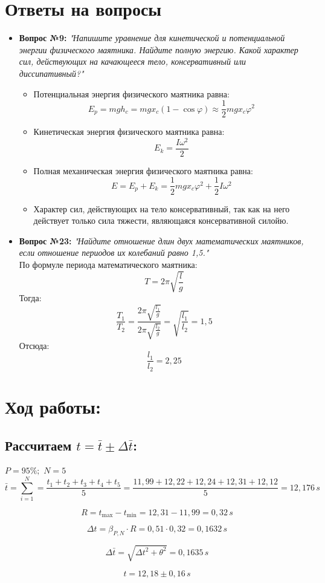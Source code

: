\documentclass[a4paper,12pt]{report}
\begin{document}
\newpage
\section*{Ответы на вопросы}

\begin{itemize}
    \item \textbf{Вопрос №9:}
    	\textit{"Напишите уравнение для кинетической и потенциальной энергии физического маятника. Найдите полную энергию. Какой характер сил, действующих на качающееся тело, консервативный или диссипативный?"}
        \begin{itemize}
            \item Потенциальная энергия физического маятника равна:
            \[ E_p = mgh_c = mgx_c(1-\cos\varphi) \approx \frac{1}{2}mgx_c\varphi^2 \]
            \item Кинетическая энергия физического маятника равна:
            \[ E_k = \frac{I\omega^2}{2} \]
            \item Полная механическая энергия физического маятника равна:
            \[ E = E_p + E_k = \frac{1}{2}mgx_c\varphi^2 + \frac{1}{2}I\omega^2 \]
            \item Характер сил, действующих на тело консервативный, так как на него действует только сила тяжести, являющаяся консервативной силойю.
        \end{itemize}
    \item \textbf{Вопрос №23:}
        \textit{"Найдите отношение длин двух математических маятников, если отношение  периодов их колебаний равно 1,5."}
        \\По формуле периода математического маятника:
        \[ T = 2\pi\sqrt{\frac{l}{g}} \]
        Тогда:
        \[ \frac{T_1}{T_2} = \frac{2\pi\sqrt{\frac{l_1}{g}}}{2\pi\sqrt{\frac{l_2}{g}}} = \sqrt{\frac{l_1}{l_2}} = 1,5 \]
        Отсюда: 
        \[\frac{l_1}{l_2} = 2,25\]
\end{itemize}

\newpage

\section*{Ход работы:}

\subsection*{\textbf{Рассчитаем $t = \bar{t} \pm \Delta \bar{t} $:}}

\begin{flushleft}
$P = 95\%;$
$N = 5$
\[ \bar{t} = \sum_{i = 1}^{N} = 
\frac{t_1+t_2+t_3+t_4+t_5}{5} = 
\frac{11,99+12,22+12,24+12,31+12,12}{5} = 12,176 \, s \]

\[R = t_{\max} - t_{\min} = 12,31 - 11,99 = 0,32 \, s\]

\[\Delta t = \beta_{P,N} \cdot R = 0,51 \cdot 0,32 = 0,1632 \, s\]

\[\Delta \bar{t} = \sqrt{\Delta t^2 + \theta^2} = 0,1635 \, s\]

\[t = 12,18 \pm 0,16 \, s\]

\end{flushleft}
\end{document}
